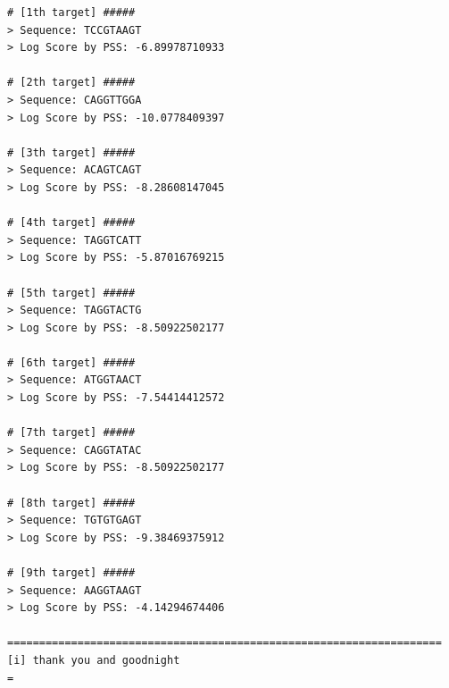 \begin{lstlisting}[caption=Der Konsolenoutput des PSS Programms. Als Zielsequenzen zum Berechnen eines Scores wurde dasselbe File verwendet\, wie zum Einlesen des alignierten Sequenzen.]
# [1th target] #####
> Sequence: TCCGTAAGT
> Log Score by PSS: -6.89978710933

# [2th target] #####
> Sequence: CAGGTTGGA
> Log Score by PSS: -10.0778409397

# [3th target] #####
> Sequence: ACAGTCAGT
> Log Score by PSS: -8.28608147045

# [4th target] #####
> Sequence: TAGGTCATT
> Log Score by PSS: -5.87016769215

# [5th target] #####
> Sequence: TAGGTACTG
> Log Score by PSS: -8.50922502177

# [6th target] #####
> Sequence: ATGGTAACT
> Log Score by PSS: -7.54414412572

# [7th target] #####
> Sequence: CAGGTATAC
> Log Score by PSS: -8.50922502177

# [8th target] #####
> Sequence: TGTGTGAGT
> Log Score by PSS: -9.38469375912

# [9th target] #####
> Sequence: AAGGTAAGT
> Log Score by PSS: -4.14294674406

====================================================================
[i] thank you and goodnight
=
\end{lstlisting}

\pagebreak
{}


\pagebreak


\pagebreak


